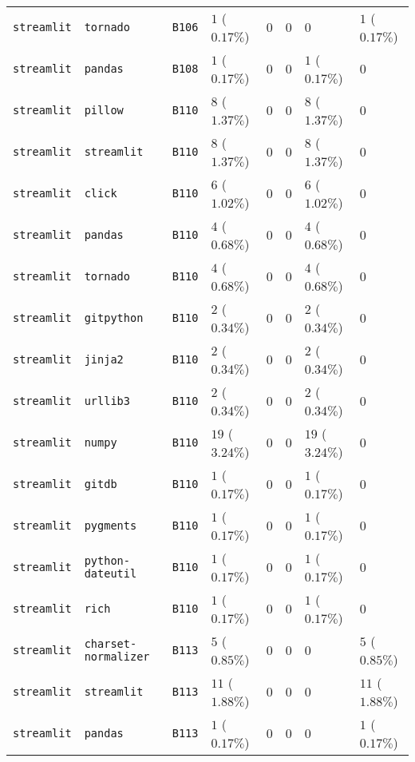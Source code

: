 \begin{table}
\begin{tabular}{llllllll}
\texttt{streamlit} & \texttt{tornado} & \texttt{B106} & $1$ ($0.17\%$) & $0$ & $0$ & $0$ & $1$ ($0.17\%$) \\
\texttt{streamlit} & \texttt{pandas} & \texttt{B108} & $1$ ($0.17\%$) & $0$ & $0$ & $1$ ($0.17\%$) & $0$ \\
\texttt{streamlit} & \texttt{pillow} & \texttt{B110} & $8$ ($1.37\%$) & $0$ & $0$ & $8$ ($1.37\%$) & $0$ \\
\texttt{streamlit} & \texttt{streamlit} & \texttt{B110} & $8$ ($1.37\%$) & $0$ & $0$ & $8$ ($1.37\%$) & $0$ \\
\texttt{streamlit} & \texttt{click} & \texttt{B110} & $6$ ($1.02\%$) & $0$ & $0$ & $6$ ($1.02\%$) & $0$ \\
\texttt{streamlit} & \texttt{pandas} & \texttt{B110} & $4$ ($0.68\%$) & $0$ & $0$ & $4$ ($0.68\%$) & $0$ \\
\texttt{streamlit} & \texttt{tornado} & \texttt{B110} & $4$ ($0.68\%$) & $0$ & $0$ & $4$ ($0.68\%$) & $0$ \\
\texttt{streamlit} & \texttt{gitpython} & \texttt{B110} & $2$ ($0.34\%$) & $0$ & $0$ & $2$ ($0.34\%$) & $0$ \\
\texttt{streamlit} & \texttt{jinja2} & \texttt{B110} & $2$ ($0.34\%$) & $0$ & $0$ & $2$ ($0.34\%$) & $0$ \\
\texttt{streamlit} & \texttt{urllib3} & \texttt{B110} & $2$ ($0.34\%$) & $0$ & $0$ & $2$ ($0.34\%$) & $0$ \\
\texttt{streamlit} & \texttt{numpy} & \texttt{B110} & $19$ ($3.24\%$) & $0$ & $0$ & $19$ ($3.24\%$) & $0$ \\
\texttt{streamlit} & \texttt{gitdb} & \texttt{B110} & $1$ ($0.17\%$) & $0$ & $0$ & $1$ ($0.17\%$) & $0$ \\
\texttt{streamlit} & \texttt{pygments} & \texttt{B110} & $1$ ($0.17\%$) & $0$ & $0$ & $1$ ($0.17\%$) & $0$ \\
\texttt{streamlit} & \texttt{python-dateutil} & \texttt{B110} & $1$ ($0.17\%$) & $0$ & $0$ & $1$ ($0.17\%$) & $0$ \\
\texttt{streamlit} & \texttt{rich} & \texttt{B110} & $1$ ($0.17\%$) & $0$ & $0$ & $1$ ($0.17\%$) & $0$ \\
\texttt{streamlit} & \texttt{charset-normalizer} & \texttt{B113} & $5$ ($0.85\%$) & $0$ & $0$ & $0$ & $5$ ($0.85\%$) \\
\texttt{streamlit} & \texttt{streamlit} & \texttt{B113} & $11$ ($1.88\%$) & $0$ & $0$ & $0$ & $11$ ($1.88\%$) \\
\texttt{streamlit} & \texttt{pandas} & \texttt{B113} & $1$ ($0.17\%$) & $0$ & $0$ & $0$ & $1$ ($0.17\%$) \\

\end{tabular}
\end{table}
